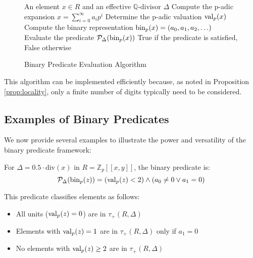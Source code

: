 \begin{figure}[ht]
\begin{center}
\begin{minipage}{0.9\textwidth}
\begin{algorithm}[H]
\caption{Binary Predicate Evaluation Algorithm}
\label{alg:predicate-evaluation}
\begin{algorithmic}[1]
\Require An element $x \in R$ and an effective $\mathbb{Q}$-divisor $\Delta$
\State Compute the p-adic expansion $x = \sum_{i=0}^{\infty} a_i p^i$
\State Determine the p-adic valuation $\operatorname{val}_p(x)$
\State Compute the binary representation $\operatorname{bin}_p(x) = (a_0, a_1, a_2, \ldots)$
\State Evaluate the predicate $\mathcal{P}_\Delta(\operatorname{bin}_p(x))$
\State \Return True if the predicate is satisfied, False otherwise
\end{algorithmic}
\end{algorithm}
\end{minipage}
\end{center}
\end{figure}

This algorithm can be implemented efficiently because, as noted in Proposition \ref{prop:locality}, only a finite number of digits typically need to be considered.

\subsection{Examples of Binary Predicates}

We now provide several examples to illustrate the power and versatility of the binary predicate framework:

\begin{example}\label{ex:standard-divisor}
For $\Delta = 0.5 \cdot \text{div}(x)$ in $R = \mathbb{Z}_p[[x,y]]$, the binary predicate is:
$$\mathcal{P}_\Delta(\operatorname{bin}_p(z)) = (\operatorname{val}_p(z) < 2) \wedge (a_0 \neq 0 \vee a_1 = 0)$$

This predicate classifies elements as follows:
\begin{itemize}
    \item All units ($\operatorname{val}_p(z) = 0$) are in $\tau_+(R,\Delta)$
    \item Elements with $\operatorname{val}_p(z) = 1$ are in $\tau_+(R,\Delta)$ only if $a_1 = 0$
    \item No elements with $\operatorname{val}_p(z) \geq 2$ are in $\tau_+(R,\Delta)$
\end{itemize}
\end{example}

